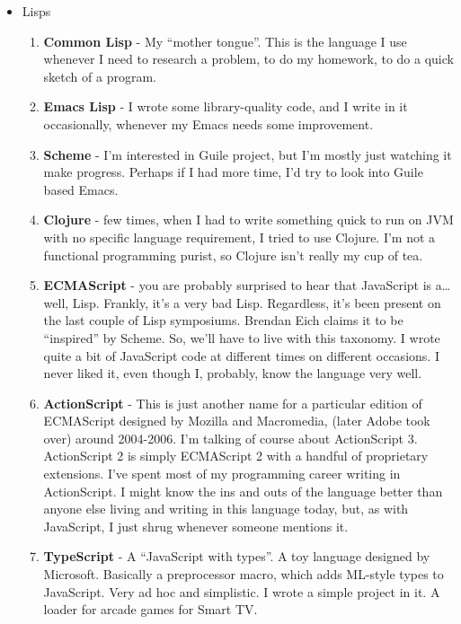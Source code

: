 \documentclass[oneside]{memoir}
\begin{document}
\begin{itemize}
\item Lisps
\begin{enumerate}
\item \textbf{Common Lisp} - My ``mother tongue''.  This is the language I use whenever
I need to research a problem, to do my homework, to do a quick sketch of
a program.
\item \textbf{Emacs Lisp} - I wrote some library-quality code, and I write in it
occasionally, whenever my Emacs needs some improvement.
\item \textbf{Scheme} - I'm interested in Guile project, but I'm mostly just watching
it make progress.  Perhaps if I had more time, I'd try to look into Guile
based Emacs.
\item \textbf{Clojure} - few times, when I had to write something quick to run on JVM
with no specific language requirement, I tried to use Clojure.  I'm not a
functional programming purist, so Clojure isn't really my cup of tea.
\item \textbf{ECMAScript} - you are probably surprised to hear that JavaScript is a\ldots{}
well, Lisp.  Frankly, it's a very bad Lisp.  Regardless, it's been
present on the last couple of Lisp symposiums.  Brendan Eich claims it to
be ``inspired'' by Scheme.  So, we'll have to live with this taxonomy.  I
wrote quite a bit of JavaScript code at different times on different
occasions.  I never liked it, even though I, probably, know the language
very well.
\item \textbf{ActionScript} - This is just another name for a particular edition of 
ECMAScript designed by Mozilla and Macromedia, (later Adobe took over)
around 2004-2006.  I'm talking of course about ActionScript 3.
ActionScript 2 is simply ECMAScript 2 with a handful of proprietary
extensions.  I've spent most of my programming career writing in
ActionScript.  I might know the ins and outs of the language better than
anyone else living and writing in this language today, but, as with
JavaScript, I just shrug whenever someone mentions it.
\item \textbf{TypeScript} - A ``JavaScript with types''.  A toy language designed by
Microsoft.  Basically a preprocessor macro, which adds ML-style types to
JavaScript.  Very ad hoc and simplistic.  I wrote a simple project in it.
A loader for arcade games for Smart TV.
\end{enumerate}


\end{itemize}
\end{document}
